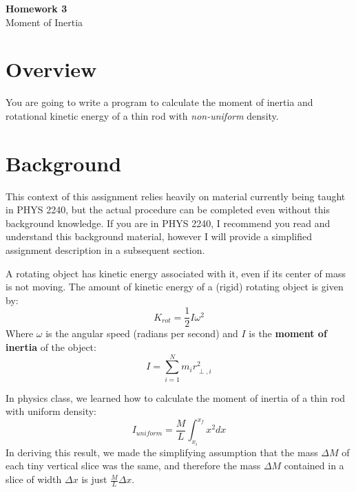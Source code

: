 \documentclass{article}
\begin{document}
\fancyfoot[C]{\thepage}
\vspace*{0cm}
\begin{center}
	{\LARGE \textbf{Homework 3}}\\
	\vspace{.25cm}
	{\Large Moment of Inertia}
\end{center}
\section*{Overview}
You are going to write a program to calculate the moment of inertia and rotational kinetic energy of a thin rod with \textit{non-uniform} density.

\section*{Background}
This context of this assignment relies heavily on material currently being taught in PHYS 2240, but the actual procedure can be completed even without this background knowledge. If you are in PHYS 2240, I recommend you read and understand this background material, however I will provide a simplified assignment description in a subsequent section.

A rotating object has kinetic energy associated with it, even if its center of mass is not moving. The amount of kinetic energy of a (rigid) rotating object is given by:
\begin{equation}
	K_{rot}=\frac{1}{2}I\omega^2
\end{equation}
Where $\omega$ is the angular speed (radians per second) and $I$ is the \textbf{moment of inertia} of the object:
\begin{equation}
	I=\sum_{i=1}^{N}m_ir_{\perp,i}^2
\end{equation}

In physics class, we learned how to calculate the moment of inertia of a thin rod with uniform density:
\begin{equation}
	I_{uniform}=\frac{M}{L}\int_{x_i}^{x_f}x^2dx
\end{equation}
In deriving this result, we made the simplifying assumption that the mass $\Delta M$ of each tiny vertical slice was the same, and therefore the mass $\Delta M$ contained in a slice of width $\Delta x$ is just $\frac{M}{L}\Delta x$. 
\end{document}
